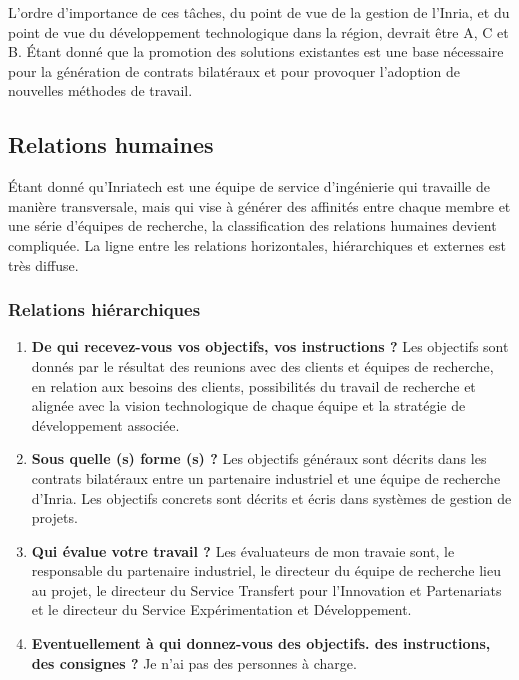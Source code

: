 \documentclass{resume} %
\begin{document}
L'ordre d'importance de ces tâches, du point de vue de la gestion de l'Inria, et du point de vue du développement technologique dans la région, devrait être A, C et B. Étant donné que la promotion des solutions existantes est une base nécessaire pour la génération de contrats bilatéraux et pour provoquer l'adoption de nouvelles méthodes de travail. 


	\subsection{Relations humaines}
	Étant donné qu'Inriatech est une équipe de service d'ingénierie qui travaille de manière transversale, mais qui vise à générer des affinités entre chaque membre et une série d'équipes de recherche, la classification des relations humaines devient compliquée. La ligne entre les relations horizontales, hiérarchiques et externes est très diffuse.
	
		\subsubsection {Relations hiérarchiques}
		\begin{enumerate}
			\item \textbf{De qui recevez-vous vos objectifs, vos instructions ?}
				Les objectifs sont donnés par le résultat des reunions avec des clients et équipes de recherche, en relation aux besoins des clients, possibilités du travail de recherche et alignée avec la vision technologique de chaque équipe et la stratégie de développement associée.
		\item \textbf{Sous quelle (s) forme (s) ?}
				Les objectifs généraux sont décrits dans les contrats bilatéraux entre un partenaire industriel et une équipe de recherche d'Inria. 
				Les objectifs concrets sont décrits et écris dans systèmes de gestion de projets. 
		\item \textbf{Qui évalue votre travail ?}
				Les évaluateurs de mon travaie sont, le responsable du partenaire industriel, le directeur du équipe de recherche lieu au projet, le directeur du Service Transfert pour l'Innovation et Partenariats et le directeur du Service Expérimentation et Développement. 
		\item  \textbf{Eventuellement à qui donnez-vous des objectifs. des instructions, des consignes ?}
			Je n'ai pas des personnes \`a charge.
		\end{enumerate}
\end{document}
